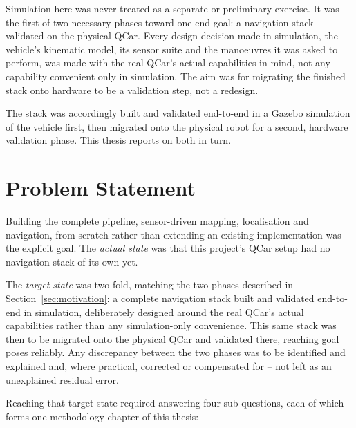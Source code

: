 Simulation here was never treated as a separate or preliminary
exercise. It was the first of two necessary phases toward one end
goal: a navigation stack validated on the physical QCar. Every
design decision made in simulation, the vehicle's kinematic model,
its sensor suite and the manoeuvres it was asked to perform, was made
with the real QCar's actual capabilities in mind, not any capability
convenient only in simulation. The aim was for migrating the
finished stack onto hardware to be a validation step, not a
redesign.

The stack was accordingly built and validated end-to-end in a
Gazebo simulation of the vehicle first, then migrated onto the
physical robot for a second, hardware validation phase. This thesis
reports on both in turn.

\section{Problem Statement}
\label{sec:problem-statement}

Building the complete pipeline, sensor-driven mapping, localisation
and navigation, from scratch rather than extending an existing
implementation was the explicit goal. The \emph{actual state} was
that this project's QCar setup had no navigation stack of its own yet.

The \emph{target state} was two-fold, matching the two phases
described in Section~\ref{sec:motivation}: a complete navigation
stack built and validated end-to-end in simulation, deliberately
designed around the real QCar's actual capabilities rather than any
simulation-only convenience. This same stack was then to be migrated
onto the physical QCar and validated there, reaching goal poses
reliably. Any discrepancy between the two phases was to be identified
and explained and, where practical, corrected or compensated for --
not left as an unexplained residual error.

Reaching that target state required answering four sub-questions,
each of which forms one methodology chapter of this thesis:

